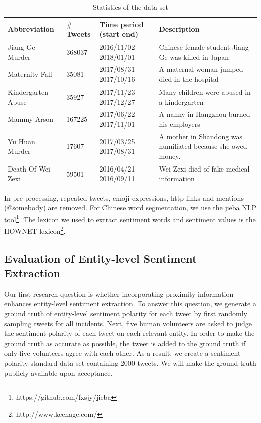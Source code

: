 \documentclass[runningheads]{llncs}
\begin{document}
\begin{table}
\begin{center}
\tiny
\caption{Statistics of the data set}\label{table:social event}
\begin{tabular}{|l|l|l|l|}
\hline
Abbreviation   & $\#$Tweets & Time period (start end) &  Description                                           \\ \hline
Jiang Ge Murder      & 368037 & 2016/11/02 2018/01/01   & Chinese female student Jiang Ge was killed in Japan         \\ \hline
Maternity Fall        & 35081  & 2017/08/31 2017/10/16   & A maternal woman jumped died in the hospital                \\ \hline
Kindergarten Abuse     & 35927  & 2017/11/23 2017/12/27   & Many children were abused in a kindergarten                 \\ \hline
Mammy Arson  & 167225 & 2017/06/22 2017/11/01   & A nanny in Hangzhou burned his employers                    \\ \hline
Yu Huan Murder & 17607  & 2017/03/25 2017/08/31   & A mother in Shandong was humiliated because she owed money. \\ \hline
Death Of Wei Zexi   & 59501  & 2016/04/21 2016/09/11   & Wei Zexi died of fake medical information                   \\ \hline
\end{tabular}
\end{center}
\label{default}
\end{table}

In pre-processing, repeated tweets, emoji expressions, http links and mentions (@somebody) are removed. For Chinese word segmentation, we use the jieba NLP tool\footnote{https://github.com/fxsjy/jieba}. The lexicon we used to extract sentiment words and sentiment values is the HOWNET lexicon\footnote{http://www.keenage.com/}. 

\subsection{Evaluation of Entity-level Sentiment Extraction}\label{sec:Evaluation of Entity-level Sentiment Extraction}
Our first research question is whether incorporating proximity information enhances entity-level sentiment extraction. To answer this question, we generate a ground truth of entity-level sentiment polarity for each tweet by first randomly sampling tweets 
for all incidents. Next, five human volunteers are asked to judge the sentiment polarity of each tweet on each relevant entity. In order to make the ground truth as accurate as possible, the tweet is added to the ground truth if only five volunteers agree with each other. 
As a result, we create a sentiment polarity standard data set containing 2000 tweets.
We will make the ground truth publicly available upon acceptance. 
\end{document}

